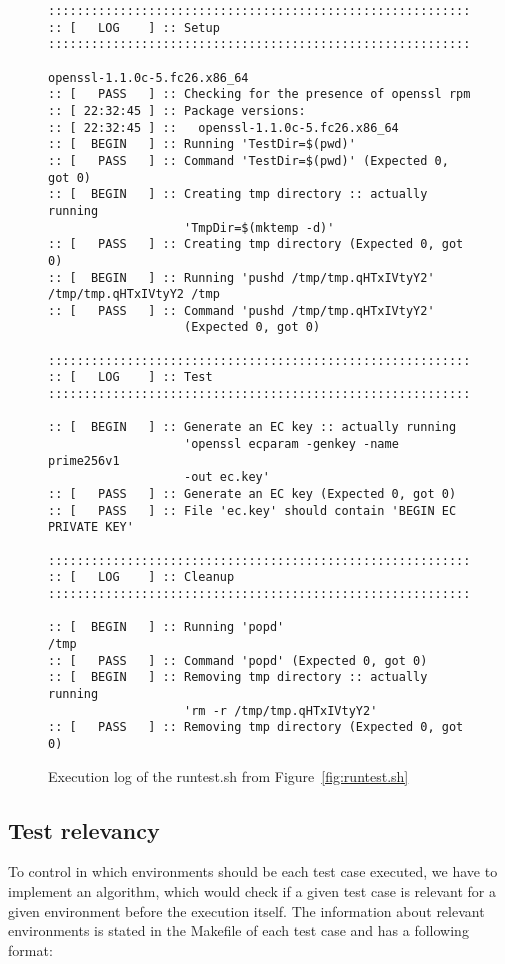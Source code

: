     \begin{figure}
        \begin{lstlisting}[basicstyle=\small]
:::::::::::::::::::::::::::::::::::::::::::::::::::::::::::::::
:: [   LOG    ] :: Setup
:::::::::::::::::::::::::::::::::::::::::::::::::::::::::::::::

openssl-1.1.0c-5.fc26.x86_64
:: [   PASS   ] :: Checking for the presence of openssl rpm
:: [ 22:32:45 ] :: Package versions:
:: [ 22:32:45 ] ::   openssl-1.1.0c-5.fc26.x86_64
:: [  BEGIN   ] :: Running 'TestDir=$(pwd)'
:: [   PASS   ] :: Command 'TestDir=$(pwd)' (Expected 0, got 0)
:: [  BEGIN   ] :: Creating tmp directory :: actually running
                   'TmpDir=$(mktemp -d)'
:: [   PASS   ] :: Creating tmp directory (Expected 0, got 0)
:: [  BEGIN   ] :: Running 'pushd /tmp/tmp.qHTxIVtyY2'
/tmp/tmp.qHTxIVtyY2 /tmp
:: [   PASS   ] :: Command 'pushd /tmp/tmp.qHTxIVtyY2'
                   (Expected 0, got 0)

:::::::::::::::::::::::::::::::::::::::::::::::::::::::::::::::
:: [   LOG    ] :: Test
:::::::::::::::::::::::::::::::::::::::::::::::::::::::::::::::

:: [  BEGIN   ] :: Generate an EC key :: actually running
                   'openssl ecparam -genkey -name prime256v1
                   -out ec.key'
:: [   PASS   ] :: Generate an EC key (Expected 0, got 0)
:: [   PASS   ] :: File 'ec.key' should contain 'BEGIN EC PRIVATE KEY'

:::::::::::::::::::::::::::::::::::::::::::::::::::::::::::::::
:: [   LOG    ] :: Cleanup
:::::::::::::::::::::::::::::::::::::::::::::::::::::::::::::::

:: [  BEGIN   ] :: Running 'popd'
/tmp
:: [   PASS   ] :: Command 'popd' (Expected 0, got 0)
:: [  BEGIN   ] :: Removing tmp directory :: actually running
                   'rm -r /tmp/tmp.qHTxIVtyY2'
:: [   PASS   ] :: Removing tmp directory (Expected 0, got 0)
        \end{lstlisting}
        \caption{Execution log of the runtest.sh from Figure~\ref{fig:runtest.sh}}
        \label{fig:runtest.sh-log}
    \end{figure}

\subsection{Test relevancy} \label{ref:test-relevancy}
    To control in which environments should be each test case executed, we have
    to implement an algorithm, which would check if a given test case is relevant
    for a given environment before the execution itself. The information about
    relevant environments is stated in the Makefile of each test case and has
    a following format:

